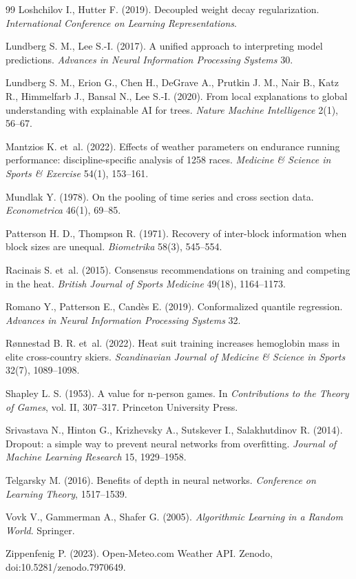 \documentclass[11pt,a4paper]{article}
\begin{document}
\begin{thebibliography}{99}
Loshchilov I., Hutter F. (2019). Decoupled weight decay regularization. \emph{International Conference on Learning
Representations}.

Lundberg S. M., Lee S.-I. (2017). A unified approach to interpreting model predictions. \emph{Advances in Neural
Information Processing Systems} 30.

Lundberg S. M., Erion G., Chen H., DeGrave A., Prutkin J. M., Nair B., Katz R., Himmelfarb J., Bansal N., Lee S.-I.
(2020). From local explanations to global understanding with explainable AI for trees. \emph{Nature Machine
Intelligence} 2(1), 56--67.

Mantzios K. et~al. (2022).
Effects of weather parameters on endurance running performance: discipline-specific analysis of 1258 races.
\emph{Medicine \& Science in Sports \& Exercise} 54(1), 153--161.

Mundlak Y. (1978). On the pooling of time series and cross section data. \emph{Econometrica} 46(1), 69--85.

Patterson H. D., Thompson R. (1971). Recovery of inter-block information when block sizes are unequal.
\emph{Biometrika} 58(3), 545--554.

Racinais S. et~al. (2015). Consensus recommendations on training and competing in the heat. \emph{British Journal of
Sports Medicine} 49(18), 1164--1173.

Romano Y., Patterson E., Candès E. (2019). Conformalized quantile regression. \emph{Advances in Neural Information
Processing Systems} 32.

Rønnestad B. R. et~al. (2022). Heat suit training increases hemoglobin mass in elite cross-country skiers.
\emph{Scandinavian Journal of Medicine \& Science in Sports} 32(7), 1089--1098.

Shapley L. S. (1953). A value for n-person games. In \emph{Contributions to the Theory of Games}, vol. II, 307--317.
Princeton University Press.

Srivastava N., Hinton G., Krizhevsky A., Sutskever I., Salakhutdinov R. (2014). Dropout: a simple way to prevent
neural networks from overfitting. \emph{Journal of Machine Learning Research} 15, 1929--1958.

Telgarsky M. (2016). Benefits of depth in neural networks. \emph{Conference on Learning Theory}, 1517--1539.

Vovk V., Gammerman A., Shafer G. (2005). \emph{Algorithmic Learning in a Random World}. Springer.

Zippenfenig P. (2023). Open-Meteo.com Weather API. Zenodo, doi:10.5281/zenodo.7970649.

\end{thebibliography}
\end{document}
